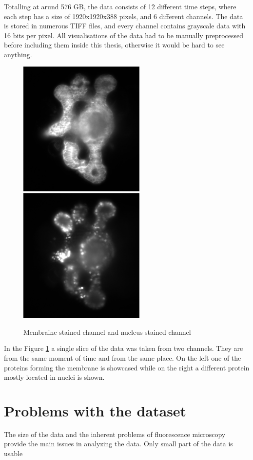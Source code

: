 \documentclass[
  digital,     %
  oneside,     %
  nosansbold,  %
  nocolorbold, %
  lof,         %
  lot,         %
]{fithesis4}
\begin{document}
Totalling at arund 576 GB, the data consists of 12 different time steps, where
each step has a size of 1920x1920x388 pixels, and 6 different channels. The data
is stored in numerous TIFF files, and every channel contains grayscale data with
16 bits per pixel. All visualisations of the data had to be manually
preprocessed before including them inside this thesis, otherwise it would be
hard to see anything.

\begin{figure}
    \begin{center}
        \includegraphics[width=6.3cm]{resources/C3-t006-200-scaled.jpg}
        \includegraphics[width=6.3cm]{resources/C2-t006-200-scaled.jpg}
    \end{center}
    \caption{Membraine stained channel and nucleus stained channel}
    \label{fig:data_example}
\end{figure}
In the Figure \ref{fig:data_example} a single slice of the data was taken from
two channels. They are from the same moment of time and from the same place. On
the left one of the proteins forming the membrane is showcased while on the right a
different protein mostly located in nuclei is shown.

\section{Problems with the dataset}

The size of the data and the inherent problems of fluorescence microscopy
provide the main issues in analyzing the data. Only small part of the data is
usable
\end{document}
